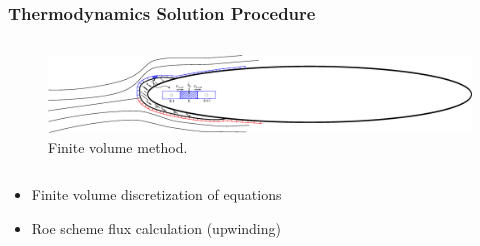 \documentclass[9pt]{beamer}
\begin{document}
\begin{frame}
\frametitle{Thermodynamics Solution Procedure}
\label{sec-3-5}

\begin{columns}[c]
\hspace*{-0.5cm}
\centering
\begin{figure}[ht]
  \centering
  \includegraphics[trim=70mm 20mm 270mm 20mm,clip,width=1\textwidth]{FiniteVolume}
  \caption{Finite volume method.}
\end{figure}
\end{columns}
\begin{itemize}
\item Finite volume discretization of equations
\item Roe scheme flux calculation (upwinding)
\end{itemize}
\end{frame}
\end{document}
